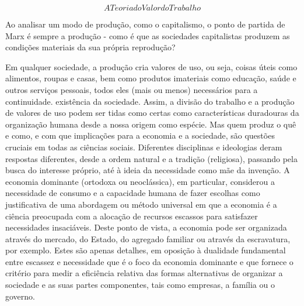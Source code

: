  \par 
\[A Teoria do Valor do Trabalho\]
 \par 
Ao analisar um modo de produção, como o capitalismo, o ponto de partida de Marx é sempre a produção - como é que as sociedades capitalistas produzem as condições materiais da sua própria reprodução?
 \par 
Em qualquer sociedade, a produção cria valores de uso, ou seja, coisas úteis como alimentos, roupas e casas, bem como produtos imateriais como educação, saúde e outros serviços pessoais, todos eles (mais ou menos) necessários para a continuidade. existência da sociedade. Assim, a divisão do trabalho e a produção de valores de uso podem ser tidas como certas como características duradouras da organização humana desde a nossa origem como espécie. Mas quem produz o quê e como, e com que implicações para a economia e a sociedade, são questões cruciais em todas as ciências sociais. Diferentes disciplinas e ideologias deram respostas diferentes, desde a ordem natural e a tradição (religiosa), passando pela busca do interesse próprio, até à ideia da necessidade como mãe da invenção. A economia dominante (ortodoxa ou neoclássica), em particular, considerou a necessidade de consumo e a capacidade humana de fazer escolhas como justificativa de uma abordagem ou método universal em que a economia é a ciência preocupada com a alocação de recursos escassos para satisfazer necessidades insaciáveis. Deste ponto de vista, a economia pode ser organizada através do mercado, do Estado, do agregado familiar ou através da escravatura, por exemplo. Estes são apenas detalhes, em oposição à dualidade fundamental entre escassez e necessidade que é o foco da economia dominante e que fornece o critério para medir a eficiência relativa das formas alternativas de organizar a sociedade e as suas partes componentes, tais como empresas, a família ou o governo.
 \par 
